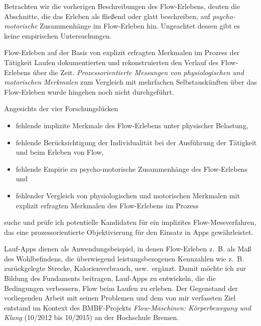 Betrachten wir die vorherigen Beschreibungen des Flow-Erlebens, deuten die Abschnitte, die das Erleben als fließend oder glatt beschreiben, auf \emph{psycho-motorische} Zusammenhänge im Flow-Erleben hin. Ungeachtet dessen gibt es keine empirischen Untersuchungen.

Flow-Erleben auf der Basis von explizit erfragten Merkmalen im Prozess der Tätigkeit Laufen dokumentierten \citet{Reinhardt2006, Schuler2009} und rekonstruierten den Verlauf des Flow-Erlebens über die Zeit. \emph{Prozessorientierte Messungen von physiologischen und motorischen Merkmalen} zum Vergleich mit mehrfachen Selbstauskünften über das Flow-Erleben wurde hingehen noch nicht durchgeführt.

Angesichts der vier Forschungslücken 
\begin{itemize}
	
	\item fehlende implizite Merkmale des Flow-Erlebens unter physischer Belastung,
	
	\item fehlende Berücksichtigung der Individualität bei der Ausführung der Tätigkeit und beim Erleben von Flow,
	
	\item fehlende Empirie zu psycho-motorische Zusammenhänge des Flow-Erlebens und
	
	\item fehlender Vergleich von physiologischen und motorischen Merkmalen mit explizit erfragten Merkmalen des Flow-Erlebens im Prozess 
\end{itemize}
suche und prüfe ich potentielle Kandidaten für ein implizites Flow-Messverfahren, das eine prozessorientierte Objektivierung für den Einsatz in Apps gewährleistet. 

Lauf-Apps dienen als Anwendungsbeispiel, in denen Flow-Erleben z.~B. als Maß des Wohlbefindens, die überwiegend leistungsbezogenen Kennzahlen wie z.~B. zurückgelegte Strecke, Kalorienverbrauch, usw.\ ergänzt. Damit möchte ich zur Bildung des Fundaments beitragen, Lauf-Apps zu entwickeln, die die Bedingungen verbessern, Flow beim Laufen zu erleben. Der Gegenstand der vorliegenden Arbeit mit seinen Problemen und dem von mir verfassten Ziel entstand im Kontext des \acs{BMBF}-Projekts \emph{Flow-Maschinen: Körperbewegung und Klang} (10/2012 bis 10/2015) an der Hochschule Bremen.

